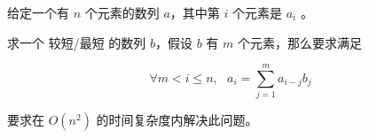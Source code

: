 给定一个有 $n$ 个元素的数列 $a$，其中第 $i$ 个元素是 $a_i$ 。

求一个 较短/最短 的数列 $b$，假设 $b$ 有 $m$ 个元素，那么要求满足

$$
\forall m<i\leq n, \ \ \ a_i = \sum_{j=1}^m a_{i-j} b_j
$$

要求在 $O(n^2)$ 的时间复杂度内解决此问题。